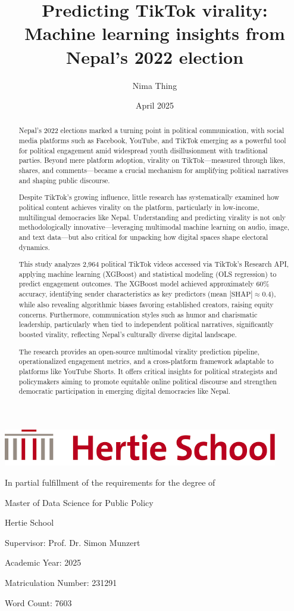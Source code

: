 \documentclass[12pt,a4paper]{report}
\title{Predicting TikTok virality: Machine learning insights from Nepal’s 2022 election }
\author{Nima Thing}
\date{April 2025}
\makeatletter
\renewcommand{\maketitle}{
\begin{titlepage}
\thispagestyle{empty}
\onehalfspacing
\setlength{\parskip}{0.5em}
\setlength{\parindent}{0pt}

\begin{minipage}{0.3\textwidth}
\raggedleft
\vspace*{1cm}
\includegraphics[width=0.9\textwidth]{figures/hertie_logo.png}
\end{minipage}

\begin{center}
\vspace*{2cm}
{\Large\bfseries\@title \par} %
\vspace{1.5cm}

{\normalsize\@author \par} %
\vspace{1cm}

{\normalsize In partial fulfillment of the requirements for the degree of \par}
{\normalsize Master of Data Science for Public Policy \par}
\vspace{0.5cm}

{\normalsize Hertie School \par}
\vspace{0.5cm}

{\normalsize Supervisor: Prof. Dr. Simon Munzert \par}
\vspace{0.5cm}

{\normalsize Academic Year: 2025 \par}
\vspace{0.5cm}

{\normalsize Matriculation Number: 231291 \par}
\vspace{0.5cm}

{\normalsize Word Count: 7603  \par}
\vspace{0.5cm}

{\normalsize\@date \par}
\vspace{1cm}

\end{center}
\end{titlepage}
}
\makeatother
\begin{document}

\maketitle


\begin{abstract}
Nepal’s 2022 elections marked a turning point in political communication, with social media platforms such as Facebook, YouTube, and TikTok emerging as a powerful tool for political engagement amid widespread youth disillusionment with traditional parties. Beyond mere platform adoption, virality on TikTok—measured through likes, shares, and comments—became a crucial mechanism for amplifying political narratives and shaping public discourse. 

Despite TikTok’s growing influence, little research has systematically examined how political content achieves virality on the platform, particularly in low-income, multilingual democracies like Nepal. Understanding and predicting virality is not only methodologically innovative—leveraging multimodal machine learning on audio, image, and text data—but also critical for unpacking how digital spaces shape electoral dynamics.

This study analyzes 2,964 political TikTok videos accessed via TikTok’s Research API, applying machine learning (XGBoost) and statistical modeling (OLS regression) to predict engagement outcomes. The XGBoost model achieved approximately 60\% accuracy, identifying sender characteristics as key predictors (mean $|\text{SHAP}| \approx 0.4$), while also revealing algorithmic biases favoring established creators, raising equity concerns. Furthermore, communication styles such as humor and charismatic leadership, particularly when tied to independent political narratives, significantly boosted virality, reflecting Nepal’s culturally diverse digital landscape.

The research provides an open-source multimodal virality prediction pipeline, operationalized engagement metrics, and a cross-platform framework adaptable to platforms like YouTube Shorts. It offers critical insights for political strategists and policymakers aiming to promote equitable online political discourse and strengthen democratic participation in emerging digital democracies like Nepal.
\end{abstract}
\end{document}
